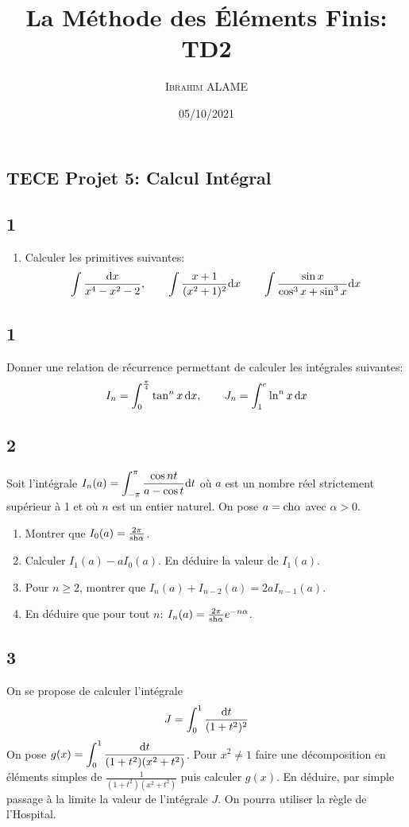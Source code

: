 \documentclass{article}[11pt]
\title{La Méthode des Éléments Finis: TD2}
\author{ \textsc{Ibrahim ALAME}}
\date{05/10/2021}
\def \de {{\rm d}}
\def \ch {{\rm ch}}
\def \sh {{\rm sh}}
\begin{document}
  \lstset{
    frame       = single,
    numbers     = left,
    showspaces  = false,
    showstringspaces    = false,
    captionpos  = t,
    caption     = \lstname
}

\begin{center}
\section*{TECE Projet 5: Calcul Intégral}
\end{center}
\subsection*{1}
\begin{enumerate}
\item  Calculer les primitives suivantes:
\[\int \frac{\de x}{x^4 -x^2-2},\qquad \int \frac{x+1}{(x^2+1)^2}\de x\qquad \int \frac{\sin x}{\cos^3x+\sin^3x}\de x\]
\end{enumerate}
\subsection*{1}
Donner une relation de récurrence permettant de calculer les intégrales suivantes:
\[I_n=\int_0^{\frac{\pi}{4}}\tan^nx\,\de x,\qquad J_n=\int_1^e\ln^nx\,\de x\]
\subsection*{2}
Soit l'intégrale $I_n(a)=\displaystyle \int_{-\pi}^{\pi}\frac{\cos nt}{a-\cos t}\de t$ où $a$ est un nombre réel strictement supérieur à 1 et où $n$ est un entier naturel. On pose $a=\ch \alpha$ avec $\alpha>0$.
\begin{enumerate}
\item Montrer que $I_0(a)=\frac{2\pi}{\sh\alpha}$.
\item Calculer $I_1(a)-aI_0(a)$. En déduire la valeur de $I_1(a)$.
\item Pour $n\geq 2$, montrer que $I_n(a)+I_{n-2}(a)=2aI_{n-1}(a)$.
\item En déduire que pour tout $n$: $I_n(a)=\frac{2\pi}{\sh\alpha}e^{-n\alpha}$.
\end{enumerate}
\subsection*{3}
On se propose de calculer l'intégrale 
\[J=\int_0^1\frac{\de t}{(1+t^2)^2}\]
On pose $g(x)=\displaystyle \int_0^1\frac{\de t}{(1+t^2)(x^2+t^2)}$. Pour $x^2\neq 1$ faire une décomposition en éléments simples de $\displaystyle \frac{1}{(1+t^2)(x^2+t^2)}$ puis calculer $g(x)$. En déduire, par simple passage à la limite la valeur de l'intégrale $J$. On pourra utiliser la règle de l'Hospital.
\end{document}
